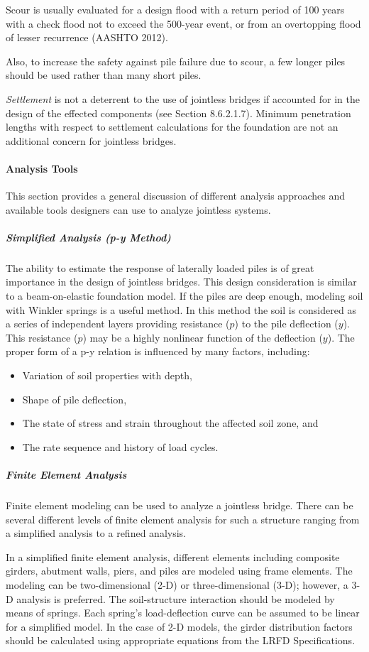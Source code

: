 Scour is usually evaluated for a design flood with a return period of 100 years with a check flood not to exceed the 500-year event, or from an overtopping flood of lesser recurrence (AASHTO 2012).

Also, to increase the safety against pile failure due to scour, a few longer piles should be used rather than many short piles.

\emph{Settlement} is not a deterrent to the use of jointless bridges if accounted for in the design of the effected components (see Section 8.6.2.1.7). Minimum penetration lengths with respect to settlement calculations for the
foundation are not an additional concern for jointless bridges.

\paragraph{Analysis Tools}
This section provides a general discussion of different analysis approaches and available tools designers can use to analyze jointless systems.

\subparagraph{Simplified Analysis (p-y Method)}
The ability to estimate the response of laterally loaded piles is of great importance in the design of jointless bridges. This design consideration is similar to a beam-on-elastic foundation model. If the piles are deep enough, modeling soil with Winkler springs is a useful method. In this method the soil is considered as a series of independent layers providing resistance ($p$) to the pile deflection ($y$). This resistance ($p$) may be a highly nonlinear function of the deflection ($y$). The proper form of a p-y relation is influenced by many factors, including:
\begin{itemize}
  \item Variation of soil properties with depth,
  \item Shape of pile deflection,
  \item The state of stress and strain throughout the affected soil zone, and
  \item The rate sequence and history of load cycles.
\end{itemize}

\subparagraph{Finite Element Analysis}
Finite element modeling can be used to analyze a jointless bridge. There can be several different levels of finite element analysis for such a structure ranging from a simplified analysis to a refined analysis.

In a simplified finite element analysis, different elements including composite girders, abutment walls, piers, and piles are modeled using frame elements. The modeling can be two-dimensional (2-D) or three-dimensional (3-D); however, a 3-D analysis is preferred. The soil-structure interaction should be modeled by means of springs. Each spring’s load-deflection curve can be assumed to be linear for a simplified model. In the case of 2-D models, the girder distribution factors should be calculated using appropriate equations from the LRFD Specifications.

